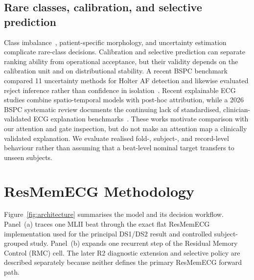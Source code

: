\documentclass[pdflatex,sn-mathphys-num]{sn-jnl}
\begin{document}
\subsection{Rare classes, calibration, and selective prediction}
Class imbalance~\cite{RN5}, patient-specific morphology, and uncertainty
estimation~\cite{RN19} complicate rare-class decisions. Calibration and
selective prediction can separate ranking ability from operational acceptance,
but their validity depends on the calibration unit and on distributional
stability. A recent BSPC benchmark compared 11 uncertainty methods for Holter
AF detection and likewise evaluated reject inference rather than confidence in
isolation~\cite{rahman2026uq}. Recent explainable ECG studies combine
spatio-temporal models with post-hoc attribution, while a 2026 BSPC systematic
review documents the continuing lack of standardised, clinician-validated ECG
explanation benchmarks~\cite{abousaber2025explainable,taleban2026xai}. These
works motivate comparison with our attention and gate inspection, but do not
make an attention map a clinically validated explanation. We evaluate realised
fold-, subject-, and record-level behaviour rather than assuming that a
beat-level nominal target transfers to unseen subjects.

\section{ResMemECG Methodology}
Figure~\ref{fig:architecture} summarises the model and its decision workflow.
Panel~(a) traces one MLII beat through the exact flat ResMemECG implementation
used for the principal DS1/DS2 result and controlled subject-grouped study.
Panel~(b) expands one recurrent step of the Residual Memory Control (RMC) cell.
The later R2 diagnostic extension and selective policy are described separately
because neither defines the primary ResMemECG forward path.
\end{document}
